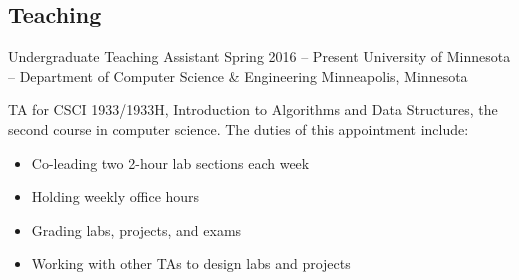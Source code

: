 \subsection{Teaching}
\block
  {Undergraduate Teaching Assistant}
  {Spring 2016 -- Present}
  {University of Minnesota -- Department of Computer Science \& Engineering}
  {Minneapolis, Minnesota}
  {}
  {
    TA for CSCI 1933/1933H, Introduction to Algorithms and Data
    Structures, the second course in computer science. The duties of this
    appointment include:
    \begin{itemize}
      \item Co-leading two 2-hour lab sections each week
      \item Holding weekly office hours
      \item Grading labs, projects, and exams
      \item Working with other TAs to design labs and projects
    \end{itemize}
  }

  \vspace{-1em}
